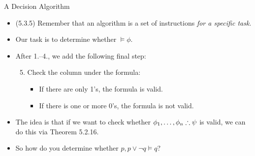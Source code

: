 \documentclass[../slides.tex]{subfiles}
\begin{document}
\begin{frame}{A Decision Algorithm}

	\begin{itemize}

	\item (5.3.5) Remember that an algorithm is a set of instructions \emph{for a specific task}.
	
	\item Our task is to determine whether $\vDash\phi$.

	\item After 1.--4., we add the following final step: 
		\begin{enumerate}[1.]
		\setcounter{enumii}{4}
		
			\item Check the column under the formula:
			
				\begin{itemize}
				
					\item If there are only 1's, the formula is valid.
					\item If there is one or more 0's, the formula is not valid.
				\end{itemize}
		\end{enumerate}

	\item The idea is that if we want to check whether $\phi_1, \mathellipsis,\phi_n\therefore\psi$ is valid, we can do this via Theorem 5.2.16.
	
	\item So how do you determine whether $p, p\lor \neg q\vDash q$?
	
	\end{itemize}

\end{frame}
\end{document}
